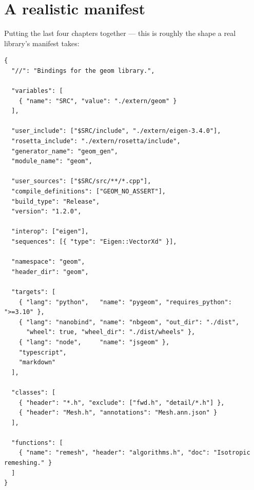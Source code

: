 \section{A realistic manifest}

Putting the last four chapters together --- this is roughly the shape a real
library's manifest takes:

\begin{lstlisting}[style=json]
{
  "//": "Bindings for the geom library.",

  "variables": [
    { "name": "SRC", "value": "./extern/geom" }
  ],

  "user_include": ["$SRC/include", "./extern/eigen-3.4.0"],
  "rosetta_include": "./extern/rosetta/include",
  "generator_name": "geom_gen",
  "module_name": "geom",

  "user_sources": ["$SRC/src/**/*.cpp"],
  "compile_definitions": ["GEOM_NO_ASSERT"],
  "build_type": "Release",
  "version": "1.2.0",

  "interop": ["eigen"],
  "sequences": [{ "type": "Eigen::VectorXd" }],

  "namespace": "geom",
  "header_dir": "geom",

  "targets": [
    { "lang": "python",   "name": "pygeom", "requires_python": ">=3.10" },
    { "lang": "nanobind", "name": "nbgeom", "out_dir": "./dist",
      "wheel": true, "wheel_dir": "./dist/wheels" },
    { "lang": "node",     "name": "jsgeom" },
    "typescript",
    "markdown"
  ],

  "classes": [
    { "header": "*.h", "exclude": ["fwd.h", "detail/*.h"] },
    { "header": "Mesh.h", "annotations": "Mesh.ann.json" }
  ],

  "functions": [
    { "name": "remesh", "header": "algorithms.h", "doc": "Isotropic remeshing." }
  ]
}
\end{lstlisting}
